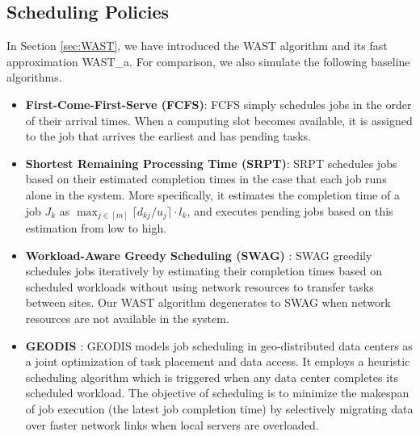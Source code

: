 \subsection{Scheduling Policies}
In Section \ref{sec:WAST}, we have introduced the WAST algorithm and its fast approximation WAST\_a. For comparison, we also simulate the following baseline algorithms.
\begin{itemize}
    \item \textbf{First-Come-First-Serve (FCFS)}: FCFS simply schedules jobs in the order of their arrival times. When a computing slot becomes available, it is assigned to the job that arrives the earliest and has pending tasks.
    
    \item \textbf{Shortest Remaining Processing Time (SRPT)}: SRPT schedules jobs based on their estimated completion times in the case that each job runs alone in the system. More specifically, it estimates the completion time of a job $J_k$ as $\max_{j \in[m]} \lceil d_{kj}/u_j\rceil \cdot l_k$, and executes pending jobs based on this estimation from low to high.%

    \item \textbf{Workload-Aware Greedy Scheduling (SWAG)} \cite{hung2015scheduling}: SWAG greedily schedules jobs iteratively by estimating their completion times based on scheduled workloads without using network resources to transfer tasks between sites. %
    Our WAST algorithm degenerates to SWAG when network resources are not available in the system. %

    \item \textbf{GEODIS} \cite{GEODIS}: GEODIS models job scheduling in geo-distributed data centers as a joint optimization of task placement and data access. It employs a heuristic scheduling algorithm which is triggered when any data center completes its scheduled workload. The objective of scheduling is to minimize the makespan of job execution (the latest job completion time) by selectively migrating data over faster network links when local servers are overloaded.
\end{itemize}
